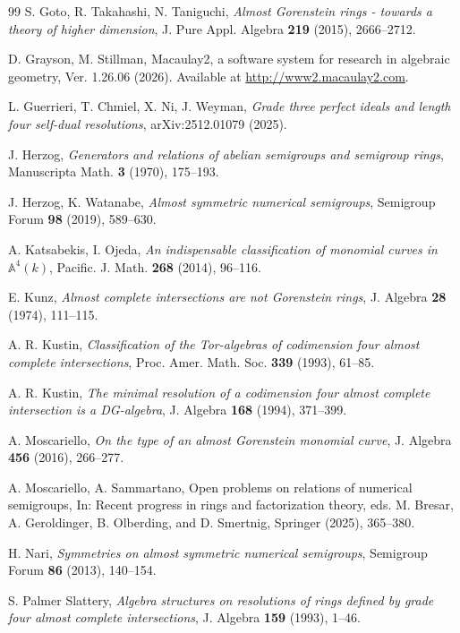 \documentclass[11pt,twoside]{amsart}
\theoremstyle{definition}
\numberwithin{equation}{section}
\begin{document}
\begin{thebibliography}{99}
 S. Goto, R. Takahashi, N. Taniguchi, \textit{Almost Gorenstein rings - towards a theory of higher dimension}, J. Pure Appl. Algebra {\bf 219} (2015), 2666--2712. 

 D. Grayson, M. Stillman, Macaulay2, a software system for research in algebraic geometry, Ver. 1.26.06 (2026). Available at \url{http://www2.macaulay2.com}.

 L. Guerrieri, T. Chmiel, X. Ni, J. Weyman, \emph{Grade three perfect ideals and length four self-dual resolutions}, arXiv:2512.01079 (2025).

 J. Herzog, \textit{Generators and relations of abelian semigroups and semigroup rings}, Manuscripta Math. \textbf{3} (1970), 175--193.

 J. Herzog, K. Watanabe, \emph{Almost symmetric numerical  semigroups},  
Semigroup Forum {\bf 98} (2019), 589--630. 

 A. Katsabekis, I. Ojeda, \textit{An indispensable classification of monomial curves in $\mathbb{A}^4(k)$}, Pacific. J. Math. {\bf 268} (2014), 96--116.

 E. Kunz, \emph{Almost complete intersections are not Gorenstein rings}, J. Algebra {\bf 28} (1974), 111--115.

A. R. Kustin, 
\textit{Classification of the Tor-algebras of codimension four almost complete intersections},
Proc. Amer. Math. Soc. {\bf 339} (1993), 61--85.

A. R. Kustin, 
\emph{The minimal resolution of a codimension four almost complete intersection is a DG-algebra},
J. Algebra {\bf 168}  (1994), 371--399.

 A. Moscariello, \emph{On the type of an almost Gorenstein monomial curve},
J. Algebra  \textbf{456} (2016), 266--277.

 A. Moscariello, A. Sammartano,
Open problems on relations of numerical semigroups, In: Recent progress in rings and factorization theory, eds. M. Bresar, A. Geroldinger, B. Olberding, and D. Smertnig, Springer (2025), 365--380.

 H. Nari, \textit{Symmetries on almost symmetric numerical semigroups}, Semigroup Forum \textbf{86} (2013), 140--154.

S. Palmer Slattery,
\emph{Algebra structures on resolutions of rings defined by grade four almost complete intersections},
J. Algebra {\bf 159} (1993), 1--46.


\end{thebibliography}
\end{document}
